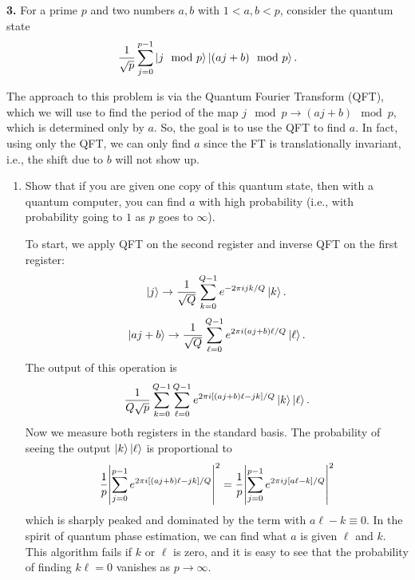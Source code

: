 \documentclass{article}
\theoremstyle{definition}
\newcommand{\f}[2]{\frac{#1}{#2}}
\begin{document}
\noindent \textbf{3. } For a prime $p$ and two numbers $a,b$ with $1 < a, b < p$, consider the quantum state
\begin{align*}
\f{1}{\sqrt{p}} \sum^{p-1}_{j=0} \ket{ j \mod p } \ket{(aj + b) \mod p}.
\end{align*}

\noindent The approach to this problem is via the Quantum Fourier Transform (QFT), which we will use to find the period of the map $j \mod p \to (aj + b) \mod p$, which is determined only by $a$. So, the goal is to use the QFT to find $a$. In fact, using only the QFT, we can only find $a$ since the FT is translationally invariant, i.e., the shift due to $b$ will not show up.   

\begin{enumerate}[label=(\alph*)]

\item Show that if you are given one copy of this quantum state, then with a quantum computer, you can find $a$ with high probability (i.e., with probability going to $1$ as $p$ goes to $\infty$). 

\noindent To start, we apply QFT on the second register and inverse QFT on the first register:
\begin{align*}
	\ket{j} \to  \f{1}{\sqrt{Q}} \sum_{k=0}^{Q-1} e^{-2\pi i jk/Q} \ket{k}.
\end{align*}
\begin{align*}
	\ket{aj + b} \to  \f{1}{\sqrt{Q}} \sum_{\ell=0}^{Q-1} e^{2\pi i (aj+b) \ell / Q} \ket{\ell}. 
\end{align*}
The output of this operation is 
\begin{align*}
	\f{1}{Q\sqrt{p}}   \sum_{k=0}^{Q-1} \sum_{\ell=0}^{Q-1} e^{2\pi i [ (aj+b)\ell - jk]  /Q } \ket{k} \ket{\ell}.
\end{align*}
Now we measure both registers in the standard basis. The probability of seeing the output $\ket{k}\ket{\ell}$ is proportional to
\begin{align*}
	\f{1}{p}\abs{\sum_{j=0}^{p-1} e^{2\pi i [ (aj+b)\ell - jk]  /Q }}^2 =  \f{1}{p}	\abs{\sum_{j=0}^{p-1} e^{2\pi i j [ a\ell - k]  /Q }}^2
\end{align*}
which is sharply peaked and dominated by the term with $a\ell - k \equiv 0$.  In the spirit of quantum phase estimation, we can find what $a$ is given $\ell$ and $k$. This algorithm fails if $k$ or $\ell$ is zero, and it is easy to see that the probability of finding $k\ell = 0$ vanishes as $p \to \infty$.


\end{enumerate}
\end{document}
